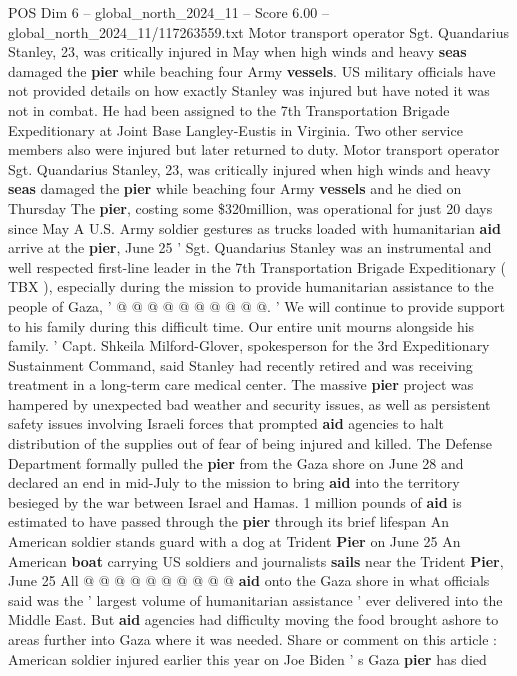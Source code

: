 \begin{textsample}{POS Dim 6 – global\_north\_2024\_11 – Score 6.00 – global\_north\_2024\_11/117263559.txt}  \label{ex:f6_pos_283}
Motor transport operator Sgt.
Quandarius Stanley, 23, was critically injured in May when high winds and heavy \textbf{seas} damaged the \textbf{pier} while beaching four Army \textbf{vessels}.
US military officials have not provided details on how exactly Stanley was injured but have noted it was not in combat.
He had been assigned to the 7th Transportation Brigade Expeditionary at Joint Base Langley-Eustis in Virginia.
Two other service members also were injured but later returned to duty.
Motor transport operator Sgt.
Quandarius Stanley, 23, was critically injured when high winds and heavy \textbf{seas} damaged the \textbf{pier} while beaching four Army \textbf{vessels} and he died on Thursday The \textbf{pier}, costing some \$320million, was operational for just 20 days since May A U.S.
Army soldier gestures as trucks loaded with humanitarian \textbf{aid} arrive at the \textbf{pier}, June 25 ' Sgt.
Quandarius Stanley was an instrumental and well respected first-line leader in the 7th Transportation Brigade Expeditionary ( TBX ), especially during the mission to provide humanitarian assistance to the people of Gaza, ' @ @ @ @ @ @ @ @ @ @. ' We will continue to provide support to his family during this difficult time.
Our entire unit mourns alongside his family. ' Capt.
Shkeila Milford-Glover, spokesperson for the 3rd Expeditionary Sustainment Command, said Stanley had recently retired and was receiving treatment in a long-term care medical center.
The massive \textbf{pier} project was hampered by unexpected bad weather and security issues, as well as persistent safety issues involving Israeli forces that prompted \textbf{aid} agencies to halt distribution of the supplies out of fear of being injured and killed.
The Defense Department formally pulled the \textbf{pier} from the Gaza shore on June 28 and declared an end in mid-July to the mission to bring \textbf{aid} into the territory besieged by the war between Israel and Hamas. 1 million pounds of \textbf{aid} is estimated to have passed through the \textbf{pier} through its brief lifespan An American soldier stands guard with a dog at Trident \textbf{Pier} on June 25 An American \textbf{boat} carrying US soldiers and journalists \textbf{sails} near the Trident \textbf{Pier}, June 25 All @ @ @ @ @ @ @ @ @ @ \textbf{aid} onto the Gaza shore in what officials said was the ' largest volume of humanitarian assistance ' ever delivered into the Middle East.
But \textbf{aid} agencies had difficulty moving the food brought ashore to areas further into Gaza where it was needed.
Share or comment on this article : American soldier injured earlier this year on Joe Biden ' s Gaza \textbf{pier} has died

\end{textsample}
